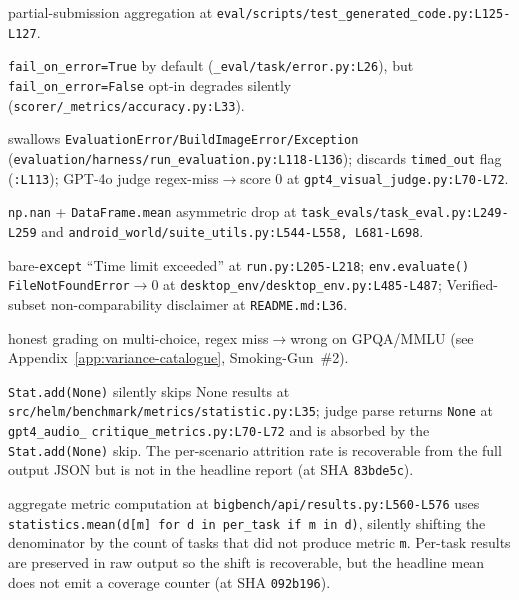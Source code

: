 \documentclass{article}
\begin{document}
\begin{description}[leftmargin=0pt,itemindent=0pt,labelindent=0pt,labelsep=0.4em,itemsep=2pt,topsep=2pt,parsep=0pt,font=\normalfont\bfseries]
\sloppy
\item[SciCode:] partial-submission aggregation at
\texttt{eval/scripts/}\allowbreak\texttt{test\_generated\_}\allowbreak\texttt{code.py:L125-L127}.

\item[inspect\_ai:] \texttt{fail\_on\_error=True} by default
(\texttt{\_eval/task/error.py:L26}), but
\texttt{fail\_on\_error=False} opt-in degrades silently
(\texttt{scorer/\_metrics/accuracy.py:L33}).

\item[ScienceAgentBench:] swallows
\texttt{EvaluationError/BuildImageError/Exception}
(\texttt{evaluation/harness/run\_evaluation.py:L118-L136});
discards \texttt{timed\_out} flag (\texttt{:L113}); GPT-4o
judge regex-miss$\to$score 0 at
\texttt{gpt4\_visual\_judge.py:L70-L72}.

\item[android\_world:] \texttt{np.nan} +
\texttt{DataFrame.mean} asymmetric drop at
\texttt{task\_evals/task\_eval.py:L249-L259} and
\texttt{android\_world/suite\_utils.py:L544-L558, L681-L698}.

\item[OSWorld (harness):] bare-\texttt{except} ``Time
limit exceeded'' at \texttt{run.py:L205-L218};
\texttt{env.evaluate()} \texttt{FileNotFoundError}$\to$0 at
\texttt{desktop\_env/desktop\_env.py:L485-L487};
Verified-subset non-comparability disclaimer at
\texttt{README.md:L36}.

\item[simple-evals (non-SimpleQA subset):] honest grading on
multi-choice, regex miss$\to$wrong on GPQA/MMLU (see
Appendix~\ref{app:variance-catalogue}, Smoking-Gun~\#2).

\item[HELM:] \texttt{Stat.add(None)} silently skips None
results at \texttt{src/helm/benchmark/metrics/statistic.py:L35};
judge parse returns \texttt{None} at \texttt{gpt4\_audio\_}%
\texttt{critique\_metrics.py:L70-L72} and is absorbed by the
\texttt{Stat.add(None)} skip. The per-scenario attrition rate
is recoverable from the full output JSON but is not in the
headline report (at SHA \texttt{83bde5c}).

\item[BIG-bench:] aggregate metric computation at
\texttt{bigbench/api/results.py:L560-L576} uses
\texttt{statistics.mean(d[m] for d in per\_task if m in d)},
silently shifting the denominator by the count of tasks that
did not produce metric \texttt{m}. Per-task results are
preserved in raw output so the shift is recoverable, but the
headline mean does not emit a coverage counter (at SHA
\texttt{092b196}).


\end{description}
\end{document}
